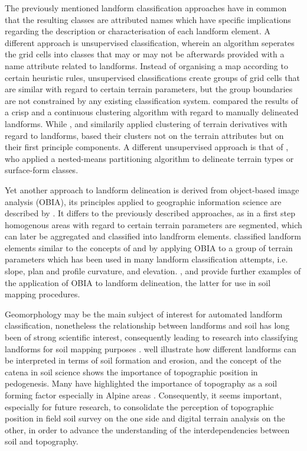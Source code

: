 \documentclass[preprint,12pt,authoryear]{elsarticle}
\begin{document}
The previously mentioned landform classification approaches have in common that the resulting classes  are attributed names which have specific implications regarding the description or characterisation of each landform element. A different approach is unsupervised classification, wherein an algorithm seperates the grid cells into classes that may or may not be afterwards provided with a name attribute related to landforms. Instead of organising a map according to certain heuristic rules, unsupervised classifications create groups of grid cells that are similar with regard to certain terrain parameters, but the group boundaries are not constrained by any existing classification system. \cite{Irvin1997} compared the results of a crisp and a continuous clustering algorithm with regard to manually delineated landforms.  While \cite{Adediran2004}, \cite{Arrell2007} and \cite{Burrough2000a}  similarily applied clustering of terrain derivatives with regard to landforms, \cite{Moravej2012} based their clusters not on the terrain attributes but on their first principle components. A different unsupervised approach is that of  \cite{Iwahashi2007}, who applied a nested-means partitioning algorithm to delineate terrain types or surface-form classes.

Yet another approach to landform delineation is derived from object-based image analysis (OBIA), its principles applied to geographic information science are described by \cite{Blaschke2014}. It differs to the previously described approaches, as in a first step homogenous areas with regard to certain terrain parameters are segmented, which can later be aggregated and classified into landfrorm elements. \cite{Dragut2006} classified landform elements similar to the concepts of \cite{Dikau1988} and \cite{Pennock1987} by applying OBIA  to a group of terrain parameters which has been used in many landform classification attempts, i.e. slope, plan and profile curvature, and  elevation. \cite{Gercek2011}, \cite{Mashimbye2014} and \cite{Kringer2009}  provide further examples of the application of OBIA to landform delineation, the latter for use in soil mapping procedures.

Geomorphology may be the main subject of interest for automated landform classification, nonetheless the relationship between landforms and soil has long been of strong scientific interest, consequently leading to research into classifying landforms for soil mapping purposes \citep{Schmidt2004,Herbst2012,Hughes2009, Barringer2008}. \cite{MacMillan2000a} well illustrate how different landforms can be interpreted in terms of soil formation and erosion, and the concept of the catena in soil science \citep{Schaetzl2013} shows the importance of topographic position in pedogenesis. Many have highlighted the importance of topography as a soil forming factor especially in Alpine areas \citep{Geitner2011,Herbst2012}. Consequently, it seems important, especially for future research, to consolidate the perception of topographic position in field soil survey on the one side and digital terrain analysis on the other, in order to advance the understanding of the interdependencies between soil and topography.
\end{document}
